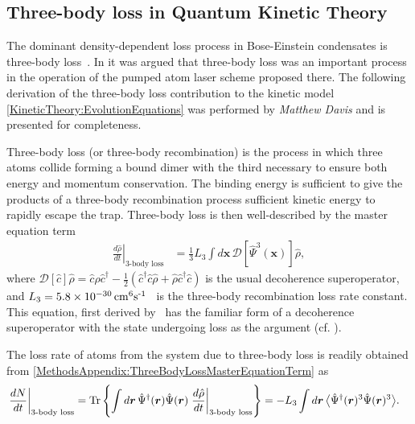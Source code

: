 \subsection{Three-body loss in Quantum Kinetic Theory}
\label{MethodsAppendix:QKT3BodyLoss}

The dominant density-dependent loss process in Bose-Einstein condensates is three-body loss~\citep{Burt:1997fk,Soding:1999}. In  it was argued that three-body loss was an important process in the operation of the pumped atom laser scheme proposed there.  The following derivation of the three-body loss contribution to the kinetic model \eqref{KineticTheory:EvolutionEquations} was performed by \emph{Matthew Davis} and is presented for completeness.

Three-body loss (or three-body recombination) is the process in which three atoms collide forming a bound dimer with the third necessary to ensure both energy and momentum conservation.  The binding energy is sufficient to give the products of a three-body recombination process sufficient kinetic energy to rapidly escape the trap.  Three-body loss is then well-described by the master equation term
\begin{align}
    \left. \frac{d \hat{\rho}}{d t}\right|_\text{3-body loss} &= \frac{1}{3}L_3 \int d \bm{x} \,\mathcal{D} \left[ \hat{\Psi}^3(\bm{x}) \right] \hat{\rho},
    \label{MethodsAppendix:ThreeBodyLossMasterEquationTerm}
\end{align}
where $\mathcal{D}[\hat{c}]\hat{\rho} = \hat{c}\hat{\rho} \hat{c}^\dagger - \frac{1}{2}(\hat{c}^\dagger \hat{c}\hat{\rho} + \hat{\rho} \hat{c}^\dagger \hat{c})$ is the usual decoherence superoperator, and $L_3 = \unit[5.8\times 10^{-30}]{cm\textsuperscript{6}s\textsuperscript{-1}}$~\citep{Burt:1997fk} is the three-body recombination loss rate constant.  This equation, first derived by~\citep{Jack:2002} has the familiar form of a decoherence superoperator with the state undergoing loss as the argument (cf. ). %

The loss rate of atoms from the system due to three-body loss is readily obtained from \eqref{MethodsAppendix:ThreeBodyLossMasterEquationTerm} as
\begin{align}
    \left.\frac{d N}{dt} \right|_\text{3-body loss} &=  \Tr\left\{\int d \bm{r}\,\hat{\Psi}^\dagger(\bm{r})\hat{\Psi}(\bm{r}) \left.\frac{d \hat{\rho}}{dt}\right|_\text{3-body loss} \right\} = - L_3 \int d \bm{r}\, \mean{\hat{\Psi}^\dagger(\bm{r})^3 \hat{\Psi}(\bm{r})^3}.
    \label{MethodsAppendix:ThreeBodyLossNumberLossRate}
\end{align}

